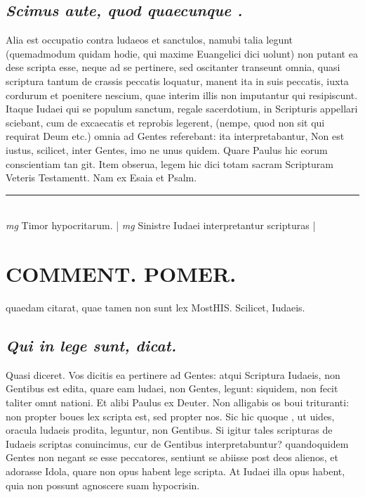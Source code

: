 \documentclass{article}
\begin{document}
\begin{pages}
\subsection*{\textit{Scimus aute, quod quaecunque . }}\pstart Alia est occupatio contra ludaeos et sanctulos, namubi talia legunt (quemadmodum quidam hodie, qui maxime Euangelici dici uolunt) non putant ea dese scripta esse, neque ad se pertinere, sed oscitanter transeunt omnia, quasi scriptura tantum de crassis peccatis loquatur, manent ita in suis peccatis, iuxta cordurum et poenitere nescium, quae interim illis non imputantur qui resipiscunt. Itaque Iudaei qui se populum sanctum, regale sacerdotium, in Scripturis appellari sciebant, cum de excaecatis et reprobis legerent, (nempe, quod non sit qui requirat Deum etc.) omnia ad Gentes referebant: ita interpretabantur, Non est iustus, scilicet, inter Gentes, imo ne unus quidem. Quare Paulus hic eorum conscientiam tan git. Item obserua, legem hic dici totam sacram Scripturam Veteris Testamentt. Nam ex Esaia et Psalm.   \pend
\vspace{0.5cm}\noindent
\vspace{0.2cm}\rule{1cm}{0.2pt}\\ 
\hspace{0.2cm}\textit{mg}
\footnotesize Timor hypocritarum.  
\normalsize| 
\hspace{0.2cm}\textit{mg}
\footnotesize Sinistre Iudaei interpretantur scripturas 
\normalsize| 
\section*{COMMENT. POMER.  }\pstart quaedam citarat, quae tamen non sunt lex MostHIS. Scilicet, Iudaeis.   \pend
{}
{}
\subsection*{\textit{Qui in lege sunt, dicat. }}\pstart Quasi diceret. Vos dicitis ea pertinere ad Gentes: atqui Scriptura Iudaeis, non Gentibus est edita, quare eam ludaei, non Gentes, legunt: siquidem, non fecit taliter omnt nationi. Et alibi Paulus ex Deuter. Non alligabis os boui trituranti: non propter boues lex scripta est, sed propter nos. Sic hic quoque , ut uides, oracula ludaeis prodita, leguntur, non Gentibus. Si igitur tales scripturas de Iudaeis scriptas conuincimus, cur de Gentibus interpretabuntur? quandoquidem Gentes non negant se esse peccatores, sentiunt se abiisse post deos alienos, et adorasse Idola, quare non opus habent lege scripta. At Iudaei illa opus habent, quia non possunt agnoscere suam hypocrisin.   \pend
{}
{}

\end{pages}
\end{document}
